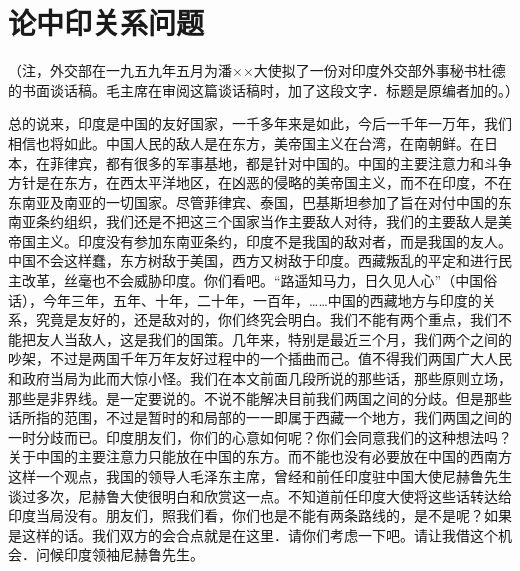 \section[论中印关系问题（一九五九年五月十五日）]{论中印关系问题}


（注，外交部在一九五九年五月为潘××大使拟了一份对印度外交部外事秘书杜德的书面谈话稿。毛主席在审阅这篇谈话稿时，加了这段文字．标题是原编者加的。）

总的说来，印度是中国的友好国家，一千多年来是如此，今后一千年一万年，我们相信也将如此。中国人民的敌人是在东方，美帝国主义在台湾，在南朝鲜。在日本，在菲律宾，都有很多的军事基地，都是针对中国的。中国的主要注意力和斗争方针是在东方，在西太平洋地区，在凶恶的侵略的美帝国主义，而不在印度，不在东南亚及南亚的一切国家。尽管菲律宾、泰国，巴基斯坦参加了旨在对付中国的东南亚条约组织，我们还是不把这三个国家当作主要敌人对待，我们的主要敌人是美帝国主义。印度没有参加东南亚条约，印度不是我国的敌对者，而是我国的友人。中国不会这样蠢，东方树敌于美国，西方又树敌于印度。西藏叛乱的平定和进行民主改革，丝毫也不会威胁印度。你们看吧。“路遥知马力，日久见人心”（中国俗话），今年三年，五年、十年，二十年，一百年，……中国的西藏地方与印度的关系，究竟是友好的，还是敌对的，你们终究会明白。我们不能有两个重点，我们不能把友人当敌人，这是我们的国策。几年来，特别是最近三个月，我们两个之间的吵架，不过是两国千年万年友好过程中的一个插曲而己。值不得我们两国广大人民和政府当局为此而大惊小怪。我们在本文前面几段所说的那些话，那些原则立场，那些是非界线。是一定要说的。不说不能解决目前我们两国之间的分歧。但是那些话所指的范围，不过是暂时的和局部的一一即属于西藏一个地方，我们两国之间的一时分歧而已。印度朋友们，你们的心意如何呢？你们会同意我们的这种想法吗？关于中国的主要注意力只能放在中国的东方。而不能也没有必要放在中国的西南方这样一个观点，我国的领导人毛泽东主席，曾经和前任印度驻中国大使尼赫鲁先生谈过多次，尼赫鲁大使很明白和欣赏这一点。不知道前任印度大使将这些话转达给印度当局没有。朋友们，照我们看，你们也是不能有两条路线的，是不是呢？如果是这样的话。我们双方的会合点就是在这里．请你们考虑一下吧。请让我借这个机会．问候印度领袖尼赫鲁先生。



